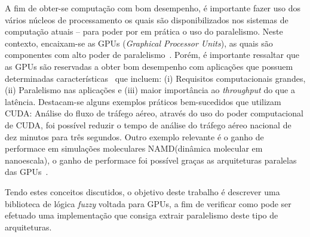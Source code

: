 \documentclass[12pt]{article}
\begin{document}
	A fim de obter-se computação com bom desempenho, é importante fazer uso dos vários núcleos de processamento os quais são disponibilizados nos sistemas de computação atuais -- para poder por em prática o uso do paralelismo. Neste contexto, encaixam-se as GPUs (\textit{Graphical Processor Units}), as quais são componentes com alto poder de paralelismo~\cite{sengupta:07}. Porém, é importante ressaltar que as GPUs são reservadas a obter bom desempenho com aplicações que possuem determinadas características~\cite{owens:08} que incluem: (i) Requisitos computacionais grandes, (ii) Paralelismo nas aplicações e (iii) maior importância ao \textit{throughput} do que a latência. Destacam-se alguns exemplos práticos bem-sucedidos que utilizam CUDA:
Análise do fluxo de tráfego aéreo, através do uso do poder computacional de CUDA, foi possível reduzir o tempo de análise do tráfego aéreo nacional
de dez minutos para três segundos. Outro exemplo relevante é o ganho de performace em simulações moleculares NAMD(dinâmica molecular em nanoescala), o ganho de performace foi possível graças as arquiteturas paralelas das GPUs~\cite{nvidia:15}.


	Tendo estes conceitos discutidos, o objetivo deste trabalho é descrever uma biblioteca de lógica \textit{fuzzy} voltada para GPUs, a fim de verificar como pode ser efetuado uma implementação que consiga extrair paralelismo deste tipo de arquiteturas.
	


\end{document}
